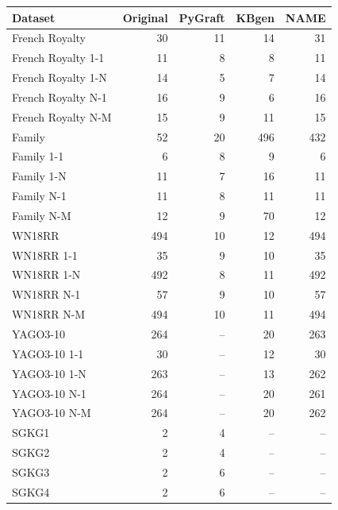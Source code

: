 \begin{tabular}{lrrrr}
\toprule
Dataset & Original & PyGraft & KBgen & NAME \\
\midrule
French Royalty & 30 & 11 & 14 & 31 \\
French Royalty 1-1 & 11 & 8 & 8 & 11 \\
French Royalty 1-N & 14 & 5 & 7 & 14 \\
French Royalty N-1 & 16 & 9 & 6 & 16 \\
French Royalty N-M & 15 & 9 & 11 & 15 \\
\midrule
Family & 52 & 20 & 496 & 432 \\
Family 1-1 & 6 & 8 & 9 & 6 \\
Family 1-N & 11 & 7 & 16 & 11 \\
Family N-1 & 11 & 8 & 11 & 11 \\
Family N-M & 12 & 9 & 70 & 12 \\
\midrule
WN18RR & 494 & 10 & 12 & 494 \\
WN18RR 1-1 & 35 & 9 & 10 & 35 \\
WN18RR 1-N & 492 & 8 & 11 & 492 \\
WN18RR N-1 & 57 & 9 & 10 & 57 \\
WN18RR N-M & 494 & 10 & 11 & 494 \\
\midrule
YAGO3-10 & 264 & – & 20 & 263 \\
YAGO3-10 1-1 & 30 & – & 12 & 30 \\
YAGO3-10 1-N & 263 & – & 13 & 262 \\
YAGO3-10 N-1 & 264 & – & 20 & 261 \\
YAGO3-10 N-M & 264 & – & 20 & 262 \\
\midrule
SGKG1 & 2 & 4 & – & – \\
SGKG2 & 2 & 4 & – & – \\
SGKG3 & 2 & 6 & – & – \\
SGKG4 & 2 & 6 & – & – \\
\bottomrule
\end{tabular}
